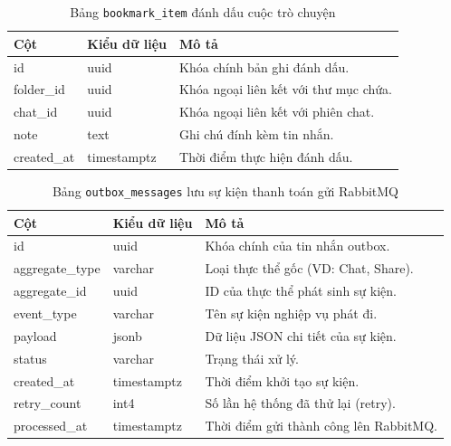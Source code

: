 \begin{table}[H]
\centering
\begin{tabular}{|l|l|p{6cm}|}
\hline
\textbf{Cột} & \textbf{Kiểu dữ liệu} & \textbf{Mô tả} \\ \hline
id & uuid & Khóa chính bản ghi đánh dấu. \\ \hline
folder\_id & uuid & Khóa ngoại liên kết với thư mục chứa. \\ \hline
chat\_id & uuid & Khóa ngoại liên kết với phiên chat. \\ \hline
note & text & Ghi chú đính kèm tin nhắn. \\ \hline
created\_at & timestamptz & Thời điểm thực hiện đánh dấu. \\ \hline
\end{tabular}
\caption{Bảng \texttt{bookmark\_item} đánh dấu cuộc trò chuyện}
\end{table}

\begin{table}[H]
\centering
\begin{tabular}{|l|l|p{6cm}|}
\hline
\textbf{Cột} & \textbf{Kiểu dữ liệu} & \textbf{Mô tả} \\ \hline
id & uuid & Khóa chính của tin nhắn outbox. \\ \hline
aggregate\_type & varchar & Loại thực thể gốc (VD: Chat, Share). \\ \hline
aggregate\_id & uuid & ID của thực thể phát sinh sự kiện. \\ \hline
event\_type & varchar & Tên sự kiện nghiệp vụ phát đi. \\ \hline
payload & jsonb & Dữ liệu JSON chi tiết của sự kiện. \\ \hline
status & varchar & Trạng thái xử lý. \\ \hline
created\_at & timestamptz & Thời điểm khởi tạo sự kiện. \\ \hline
retry\_count & int4 & Số lần hệ thống đã thử lại (retry). \\ \hline
processed\_at & timestamptz & Thời điểm gửi thành công lên RabbitMQ. \\ \hline
\end{tabular}
\caption{Bảng \texttt{outbox\_messages} lưu sự kiện thanh toán gửi RabbitMQ}
\end{table}

